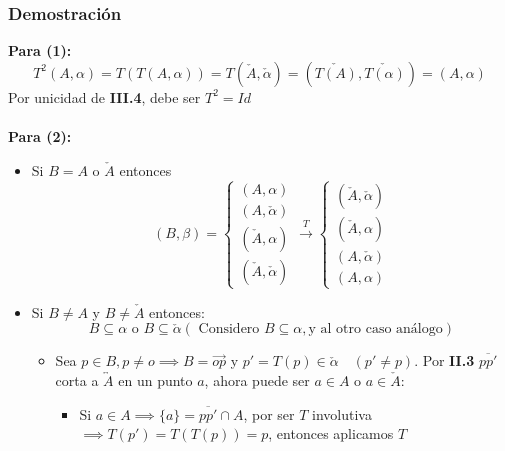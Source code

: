 \documentclass[a4paper]{article}
\begin{document}
\subsubsection{Demostración}
\textbf{Para (1):}
\begin{equation*}
    T^2(A,\alpha)=T(T(A,\alpha))=T(\check{A},\check{\alpha})=(\check{T(A)},\check{T(\alpha)})=(A,\alpha)
\end{equation*}
Por unicidad de \textbf{III.4}, debe ser $T^2=Id$\\\\
\textbf{Para (2):}
\begin{itemize}
    \item Si $B=A$ o $\check{A}$ entonces 
    \begin{equation*}
        (B,\beta)=\left\{ \begin{array}{l}
            (A,\alpha)\\
            (A,\check{\alpha})\\
            (\check{A}, \alpha)\\
            (\check{A},\check{\alpha})
        \end{array}
        \right.
        \xrightarrow{T}
        \left\{ \begin{array}{l}
            (\check{A},\check{\alpha})\\
            (\check{A}, \alpha)\\
            (A, \check{\alpha})\\
            (A,\alpha)
        \end{array}
        \right.
    \end{equation*}
    \item Si $B\neq A$ y $B \neq \check{A}$ entonces:
    \begin{equation*}
        B\subseteq \alpha \text{ o } B\subseteq \check{\alpha} (\text{ Considero }B\subseteq \alpha, \text{y al otro caso análogo})
    \end{equation*}
    \begin{itemize}
        \item Sea $p \in B, p\neq o \implies B=\overrightarrow{op}$ y $p'=T(p) \in \check{\alpha} \quad (p'\neq p)$. Por \textbf{II.3} $\overline{pp'}$ corta a $\overleftrightarrow{A}$ en un punto $a$, ahora puede ser $a \in A$ o $a \in \check{A}$:
        \begin{itemize}
            \item Si $a \in A \implies \{a\}=\overline{pp'} \cap A$, por ser $T$ involutiva $\implies T(p')=T(T(p))=p$, entonces aplicamos $T$

\end{itemize}
\end{itemize}
\end{itemize}
\end{document}

